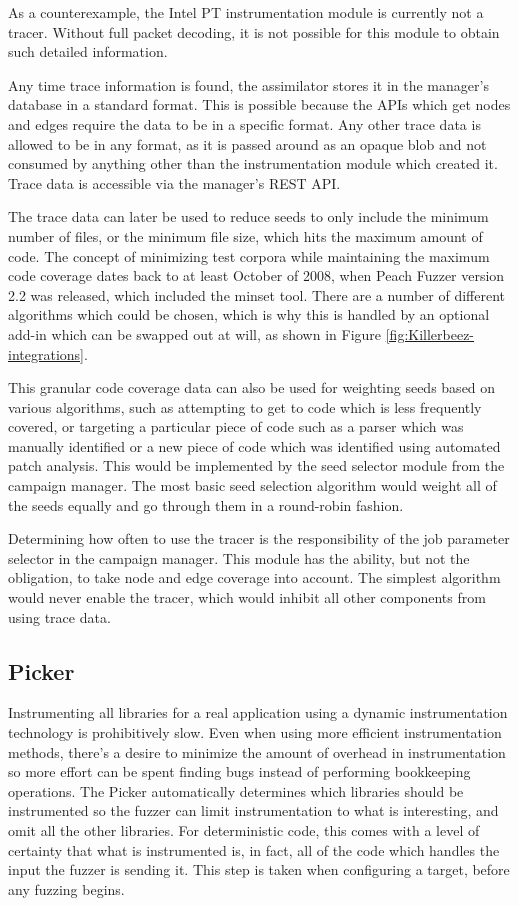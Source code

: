As a counterexample, the Intel PT instrumentation module is currently not a
tracer.  Without full \IPT{} packet decoding, it is not possible for this
module to obtain such detailed information.

Any time trace information is found, the assimilator stores it in the manager's
database in a standard format.  This is possible because the APIs which get
nodes and edges require the data to be in a specific format.  Any other trace
data is allowed to be in any format, as it is passed around as an opaque blob
and not consumed by anything other than the instrumentation module which
created it.  Trace data is accessible via the manager's REST API.

The trace data can later be used to reduce seeds to only include the minimum
number of files, or the minimum file size, which hits the maximum amount of
code. The concept of minimizing test corpora while maintaining the maximum code
coverage dates back to at least October of 2008, when Peach Fuzzer version 2.2
was released, which included the minset tool.\cite{peach22}  There are a number
of different algorithms which could be chosen, which is why this is handled by
an optional add-in which can be swapped out at will, as shown in Figure
\ref{fig:Killerbeez-integrations}.

This granular code coverage data can also be used for weighting seeds based on
various algorithms, such as attempting to get to code which is less frequently
covered, or targeting a particular piece of code such as a parser which was
manually identified or a new piece of code which was identified using automated
patch analysis. This would be implemented by the seed selector module from the
campaign manager.  The most basic seed selection algorithm would weight
all of the seeds equally and go through them in a round-robin fashion.

Determining how often to use the tracer is the responsibility of the job
parameter selector in the campaign manager.  This module has the ability, but
not the obligation, to take node and edge coverage into account.  The simplest
algorithm would never enable the tracer, which would inhibit all other
components from using trace data.

\subsection{Picker} \label{Picker}
Instrumenting all libraries for a real application using a dynamic
instrumentation technology is prohibitively slow. Even when using more
efficient instrumentation methods, there's a desire to minimize the amount of
overhead in instrumentation so more effort can be spent finding bugs instead of
performing bookkeeping operations.  The Picker automatically determines which
libraries should be instrumented so the fuzzer can limit instrumentation to
what is interesting, and omit all the other libraries. For deterministic
code, this comes with a level of certainty that what is instrumented is, in
fact, all of the code which handles the input the fuzzer is sending it. This
step is taken when configuring a target, before any fuzzing begins.

